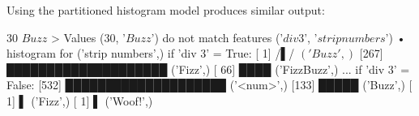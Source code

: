 Using the partitioned histogram model produces similar output:

\begin{lstnobreak}[gobble=2]
   $30$ $Buzz$
   > Values ($30$, '$Buzz$') do not
     match features ('$div 3$', '$strip numbers$')
   • histogram for ('strip numbers',) if 'div 3' = True:
     [  1] /▌/ $('Buzz',)$
     [267] ████████████████████ ('Fizz',)
     [ 66] ████ ('FizzBuzz',)
   ... if 'div 3' = False:
     [532] ████████████████████ ('<num>',)
     [133] █████ ('Buzz',)
     [  1] ▌ ('Fizz',)
     [  1] ▌ ('Woof!',)
\end{lstnobreak}
